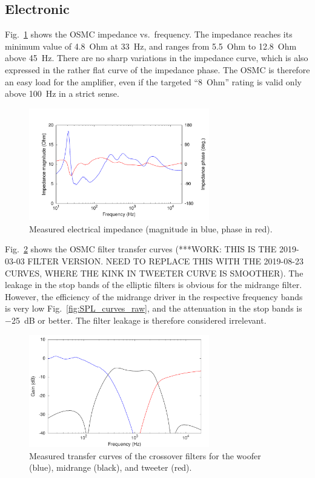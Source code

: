 \documentclass[12pt,a4paper]{article}
\providecommand{\figr}[1]{Fig.~\ref{fig:#1}}
\providecommand{\figlabel}[1]{\label{fig:#1}}
\begin{document}
\subsection{Electronic}
\figr{osmc_impedance_curve} shows the OSMC impedance vs.\ frequency. The impedance reaches its minimum value of \SI{4.8}{Ohm} at \SI{33}{Hz}, and ranges from \SI{5.5}{Ohm} to \SI{12.8}{Ohm} above \SI{45}{Hz}. There are no sharp variations in the impedance curve, which is also expressed in the rather flat curve of the impedance phase. The OSMC is therefore an easy load for the amplifier, even if the targeted ``\SI{8}{Ohm}'' rating\cite{osmc_p904} is valid only above \SI{100}{Hz} in a strict sense.

\begin{figure}[tb]
	\centering
	\includegraphics[width=0.7\textwidth]{osmc_impedance_curve.pdf}
	\caption{Measured electrical impedance (magnitude in blue, phase in red).}
	\figlabel{osmc_impedance_curve}
\end{figure}

\figr{osmc_filter_transfer} shows the OSMC filter transfer curves (***WORK: THIS IS THE 2019-03-03 FILTER VERSION. NEED TO REPLACE THIS WITH THE 2019-08-23 CURVES, WHERE THE KINK IN TWEETER CURVE IS SMOOTHER). The leakage in the stop bands of the elliptic filters is obvious for the midrange filter. However, the efficiency of the midrange driver in the respective frequency bands is very low \figr{SPL_curves_raw}, and the attenuation in the stop bands is \SI{-25}{dB} or better. The filter leakage is therefore considered irrelevant.

\begin{figure}[tb]
	\centering
	\includegraphics[width=0.7\textwidth]{osmc_filter_transfer.pdf}
	\caption{Measured transfer curves of the crossover filters for the woofer (blue), midrange (black), and tweeter (red).}
	\figlabel{osmc_filter_transfer}
\end{figure}
\end{document}
